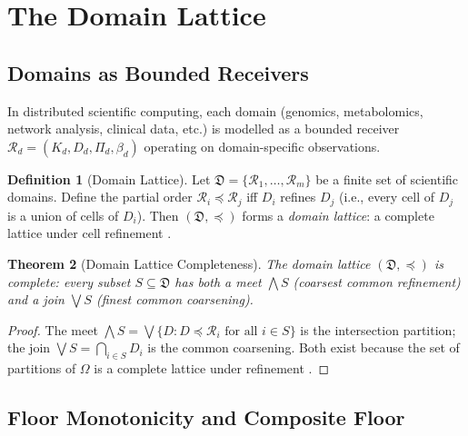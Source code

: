 \documentclass[twocolumn,11pt,a4paper]{article}
\theoremstyle{plain}
\newtheorem{theorem}{Theorem}[section]
\theoremstyle{definition}
\newtheorem{definition}[theorem]{Definition}
\theoremstyle{remark}
\begin{document}
\section{The Domain Lattice}
\label{sec:domain_lattice}

\subsection{Domains as Bounded Receivers}

In distributed scientific computing, each domain (genomics, metabolomics, network analysis, clinical data, etc.) is modelled as a bounded receiver $\mathcal{R}_d = (K_d, D_d, \Pi_d, \beta_d)$ operating on domain-specific observations.

\begin{definition}[Domain Lattice]
\label{def:domain_lattice}
Let $\mathfrak{D} = \{\mathcal{R}_1, \ldots, \mathcal{R}_m\}$ be a finite set of scientific domains.  Define the partial order $\mathcal{R}_i \preceq \mathcal{R}_j$ iff $D_i$ refines $D_j$ (i.e., every cell of $D_j$ is a union of cells of $D_i$).  Then $(\mathfrak{D}, \preceq)$ forms a \emph{domain lattice}: a complete lattice under cell refinement \citep{davey2002}.
\end{definition}

\begin{theorem}[Domain Lattice Completeness]
\label{thm:lattice}
The domain lattice $(\mathfrak{D}, \preceq)$ is complete: every subset $S \subseteq \mathfrak{D}$ has both a meet $\bigwedge S$ (coarsest common refinement) and a join $\bigvee S$ (finest common coarsening).
\end{theorem}

\begin{proof}
The meet $\bigwedge S = \bigvee\{D : D \preceq \mathcal{R}_i \text{ for all } i\in S\}$ is the intersection partition; the join $\bigvee S = \bigcap_{i\in S}D_i$ is the common coarsening.  Both exist because the set of partitions of $\Omega$ is a complete lattice under refinement \citep{davey2002}.
\end{proof}

\subsection{Floor Monotonicity and Composite Floor}
\end{document}

